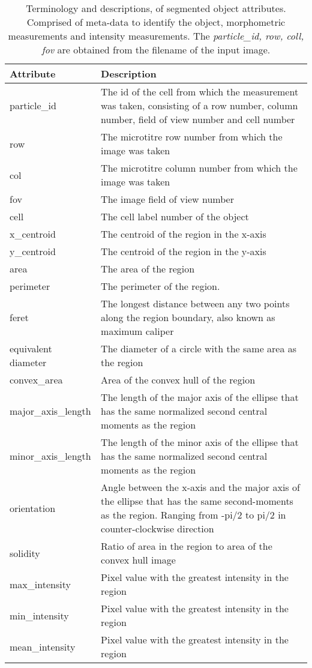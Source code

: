 \begin{table}[htbp]
\caption[Segmented region attributes and properties]{Terminology and descriptions, of segmented object attributes. Comprised of meta-data to identify the object, morphometric measurements and intensity measurements. The \emph{particle\_id, row, coll, fov} are obtained from the filename of the input image.}
\centering
\label{table:endothelial_morphometry:region_properties}
\begin{tabular}{l p{9cm}}
    \toprule
    Attribute  & Description \\
    \midrule
    particle\_id        & The id of the cell from which the measurement was taken, consisting of a row number, column number, field of view number and cell number \\
    row                 & The microtitre row number from which the image was taken \\
    col                 & The microtitre column number from which the image was taken \\
    fov                 & The image field of view number \\
    cell                & The cell label number of the object \\
    x\_centroid         & The centroid of the region in the x-axis \\
    y\_centroid         & The centroid of the region in the y-axis \\
    area                & The area of the region \\
    perimeter           & The perimeter of the region. \\
    feret               & The longest distance between any two points along the region boundary, also known as maximum caliper \\
    equivalent diameter & The diameter of a circle with the same area as the region \\
    convex\_area        & Area of the convex hull of the region \\
    major\_axis\_length & The length of the major axis of the ellipse that has the same normalized second central moments as the region \\
    minor\_axis\_length & The length of the minor axis of the ellipse that has the same normalized second central moments as the region \\
    orientation         & Angle between the x-axis and the major axis of the ellipse that has the same second-moments as the region. Ranging from -pi/2 to pi/2 in counter-clockwise direction \\
    solidity            & Ratio of area in the region to area of the convex hull image \\
    max\_intensity      & Pixel value with the greatest intensity in the region \\
    min\_intensity      & Pixel value with the greatest intensity in the region \\
    mean\_intensity     & Pixel value with the greatest intensity in the region \\
    \bottomrule
\end{tabular}
\end{table}

